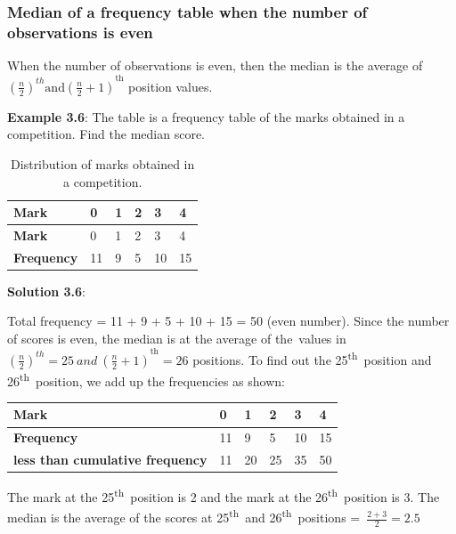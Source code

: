 \documentclass[
]{book}
\begin{document}
\subsubsection{Median of a frequency table when the number of observations is even}\label{median-of-a-frequency-table-when-the-number-of-observations-is-even}

When the number of observations is even, then the median is the average
of
\({\left( \frac{n}{2} \right)^{th}\text{and}\left( \frac{n}{2} + 1 \right)}^{\text{th}}\)
position values.

\textbf{Example 3.6}: The table is a frequency table of the marks obtained in
a competition. Find the median score.

\begin{longtable}[]{@{}llllll@{}}
\caption{\label{tab:median} Distribution of marks obtained in a competition.}\tabularnewline
\toprule\noalign{}
\textbf{Mark} & 0 & 1 & 2 & 3 & 4 \\
\midrule\noalign{}
\endfirsthead
\toprule\noalign{}
\textbf{Mark} & 0 & 1 & 2 & 3 & 4 \\
\midrule\noalign{}
\endhead
\bottomrule\noalign{}
\endlastfoot
\textbf{Frequency} & 11 & 9 & 5 & 10 & 15 \\
\end{longtable}

\textbf{Solution 3.6}:

Total frequency = 11 + 9 + 5 + 10 + 15 = 50 (even number). Since the
number of scores is even, the median is at the average of the~values in
\({\left( \frac{n}{2} \right)^{th} = 25\ and\ \left( \frac{n}{2} + 1 \right)}^{\text{th}} = 26\)
positions. To find out the 25\textsuperscript{th}~position and 26\textsuperscript{th}~position, we add
up the frequencies as shown:

\begin{longtable}[]{@{}llllll@{}}
\toprule\noalign{}
\textbf{Mark} & 0 & 1 & 2 & 3 & 4 \\
\midrule\noalign{}
\endhead
\bottomrule\noalign{}
\endlastfoot
\textbf{Frequency} & 11 & 9 & 5 & 10 & 15 \\
\textbf{less than cumulative frequency} & 11 & 20 & 25 & 35 & 50 \\
\end{longtable}

The mark at the 25\textsuperscript{th}~position is 2 and the mark at the 26\textsuperscript{th}~position
is 3. The median is the average of the scores at 25\textsuperscript{th}~and
26\textsuperscript{th}~positions =~\(\frac{2 + 3}{2} = 2.5\)
\end{document}
